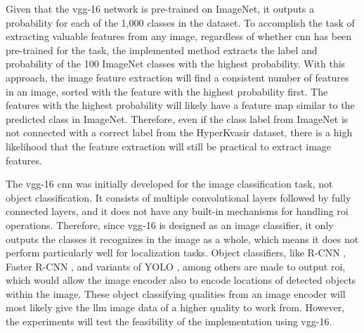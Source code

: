         Given that the \gls{vgg}-16 network is pre-trained on ImageNet, it outputs a probability for each of the 1,000 classes in the dataset. 
        To accomplish the task of extracting valuable features from any image, regardless of whether \gls{cnn} has been pre-trained for the task, the implemented method extracts the label and probability of the 100 ImageNet classes with the highest probability. With this approach, the image feature extraction will find a consistent number of features in an image, sorted with the feature with the highest probability first. The features with the highest probability will likely have a feature map similar to the predicted class in ImageNet. Therefore, even if the class label from ImageNet is not connected with a correct label from the HyperKvasir dataset, there is a high likelihood that the feature extraction will still be practical to extract image features.

        The \gls{vgg}-16 \gls{cnn} was initially developed for the image classification task, not object classification. It consists of multiple convolutional layers followed by fully connected layers, and it does not have any built-in mechanisms for handling \gls{roi} operations. 
        Therefore, since \gls{vgg}-16 is designed as an image classifier, it only outputs the classes it recognizes in the image as a whole, which means it does not perform particularly well for localization tasks. Object classifiers, like R-CNN \cite{girshickRichFeatureHierarchies2014}, Faster R-CNN \cite{renFasterRCNNRealTime2015}, and variants of YOLO \cite{redmonYouOnlyLook2016, redmonYOLO9000BetterFaster2016, redmonYOLOv3IncrementalImprovement2018, bochkovskiyYOLOv4OptimalSpeed2020, jocherYolov5, liYOLOv6SingleStageObject2022, wangYOLOv7TrainableBagoffreebies2022, jocherYOLOUltralytics2023}, among others are made to output \gls{roi}, which would allow the image encoder also to encode locations of detected objects within the image. These object classifying qualities from an image encoder will most likely give the \gls{llm} image data of a higher quality to work from. However, the experiments will test the feasibility of the implementation using \gls{vgg}-16.


        
